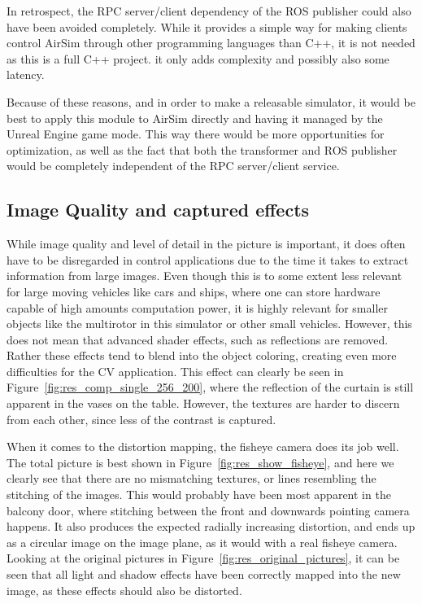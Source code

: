 In retrospect, the RPC server/client dependency of the ROS publisher could also have been avoided completely. While it provides a simple way for making clients control AirSim through other programming languages than C++, it is not needed as this is a full C++ project. it only adds complexity and possibly also some latency.

Because of these reasons, and in order to make a releasable simulator, it would be best to apply this module to AirSim directly and having it managed by the Unreal Engine game mode. This way there would be more opportunities for optimization, as well as the fact that both the transformer and ROS publisher would be completely independent of the RPC server/client service.

\subsection{Image Quality and captured effects}

While image quality and level of detail in the picture is important, it does often have to be disregarded in control applications due to the time it takes to extract information from large images. Even though this is to some extent less relevant for large moving vehicles like cars and ships, where one can store hardware capable of high amounts computation power, it is highly relevant for smaller objects like the multirotor in this simulator or other small vehicles. However, this does not mean that advanced shader effects, such as reflections are removed. Rather these effects tend to blend into the object coloring, creating even more difficulties for the CV application. This effect can clearly be seen in Figure~\ref{fig:res_comp_single_256_200}, where the reflection of the curtain is still apparent in the vases on the table. However, the textures are harder to discern from each other, since less of the contrast is captured.

When it comes to the distortion mapping, the fisheye camera does its job well. The total picture is best shown in Figure~\ref{fig:res_show_fisheye}, and here we clearly see that there are no mismatching textures, or lines resembling the stitching of the images. This would probably have been most apparent in the balcony door, where stitching between the front and downwards pointing camera happens. It also produces the expected radially increasing distortion, and ends up as a circular image on the image plane, as it would with a real fisheye camera. Looking at the original pictures in Figure~\ref{fig:res_original_pictures}, it can be seen that all light and shadow effects have been correctly mapped into the new image, as these effects should also be distorted. 

